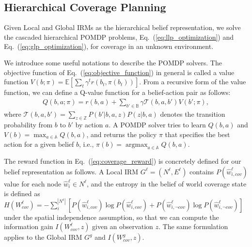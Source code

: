 \documentclass[letterpaper]{article} %
\newcommand{\phdone}[1]{} %
\newcommand{\argmax}{\mathop{\mathrm{argmax}}}
\begin{document}
\subsection{Hierarchical Coverage Planning} \label{ssec:belief-planners}

Given Local and Global IRMs as the hierarchical belief representation, we solve the cascaded hierarchical POMDP problems, Eq.~(\ref{eq:llp_optimization}) and Eq.~(\ref{eq:glp_optimization}), for coverage in an unknown environment.



\phdone{General POMDP Solver Formulation}
We introduce some useful notations to describe the POMDP solvers.
The objective function of Eq.~(\ref{eq:objective_function}) in general is called a value function $V(b; \pi) = \mathbb{E} [\sum_t \gamma^t r(b_t, \pi(b_t))]$.
%
From a recursive form of the value function, we can define a Q-value function for a belief-action pair as follows:
\begin{align}
  Q(b, a; \pi) = r(b, a) + \sum_{b' \in \mathbb{B}} \gamma \mathcal{T}(b, a, b') V(b'; \pi),
  \label{eq:q_function}
\end{align}
where $\mathcal{T}(b, a, b') = \sum_{z \in \mathbb{Z}} P(b' | b, a, z) P(z | b, a)$ denotes the transition probability from $b$ to $b'$ by action $a$.
%
A POMDP solver tries to learn $Q(b, a)$ and $V(b) = \max_{a \in \mathbb{A}} Q(b, a)$, and returns the policy $\pi$ that specifies the best action for a given belief $b$, i.e., $\pi(b) = \argmax_{a \in \mathbb{A}} Q(b, a)$.


\phdone{Reward Function--Information Gain}
The reward function in Eq.~(\ref{eq:coverage_reward}) is concretely defined for our belief representation as follows.
A Local IRM $G^\ell = (N^\ell, E^\ell)$ contains $P(\hat{w}^\ell_{i,cov})$ value for each node $\hat{w}^\ell_i \in N^\ell$,
and the entropy in the belief of world coverage state is defined as 
$H(W^\ell_{cov}) = - \sum_{i}^{|N^\ell|} [ P(\hat{w}^\ell_{i,cov}) \log P(\hat{w}^\ell_{i,cov}) + P(\hat{w}^\ell_{i,\neg cov}) \log P(\hat{w}^\ell_{i,\neg cov}) ]$ under the spatial independence assumption,
so that we can compute the information gain $I(W^\ell_{cov}, z)$ given an observation $z$.
The same formulation applies to the Global IRM $G^g$ and $I(W^g_{cov}, z)$.
\end{document}
